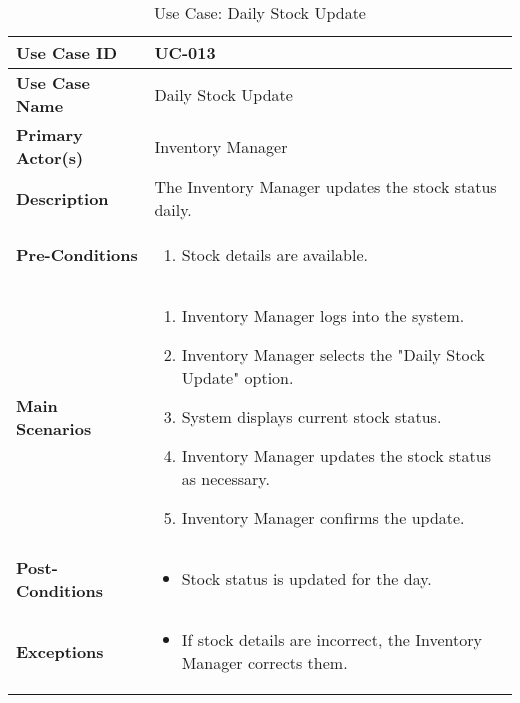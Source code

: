 \documentclass{article}
\begin{document}
\begin{table}[!ht]
    \centering
    \renewcommand{\arraystretch}{1.3}
    \begin{tabularx}{\textwidth}{|l|X|}
        \hline
        \textbf{Use Case ID} & UC-013 \\
        \hline
        \textbf{Use Case Name} & Daily Stock Update \\
        \hline
        \textbf{Primary Actor(s)} & Inventory Manager \\
        \hline
        \textbf{Description} & The Inventory Manager updates the stock status daily. \\
        \hline
        \textbf{Pre-Conditions} & 
        \begin{enumerate}[label=\arabic*.,itemsep=0pt]
            \item Stock details are available.
        \end{enumerate} \\
        \hline
        \textbf{Main Scenarios} & 
        \begin{enumerate}[label=\arabic*.,itemsep=0pt]
            \item Inventory Manager logs into the system.
            \item Inventory Manager selects the "Daily Stock Update" option.
            \item System displays current stock status.
            \item Inventory Manager updates the stock status as necessary.
            \item Inventory Manager confirms the update.
        \end{enumerate} \\
        \hline
        \textbf{Post-Conditions} & 
        \begin{itemize}[label=--,itemsep=0pt]
            \item Stock status is updated for the day.
        \end{itemize} \\
        \hline
        \textbf{Exceptions} & 
        \begin{itemize}[label=--,itemsep=0pt]
            \item If stock details are incorrect, the Inventory Manager corrects them.
        \end{itemize} \\
        \hline
    \end{tabularx}
    \caption{Use Case: Daily Stock Update}
    \label{tab:use-case-daily-stock-update}
\end{table}
\end{document}
